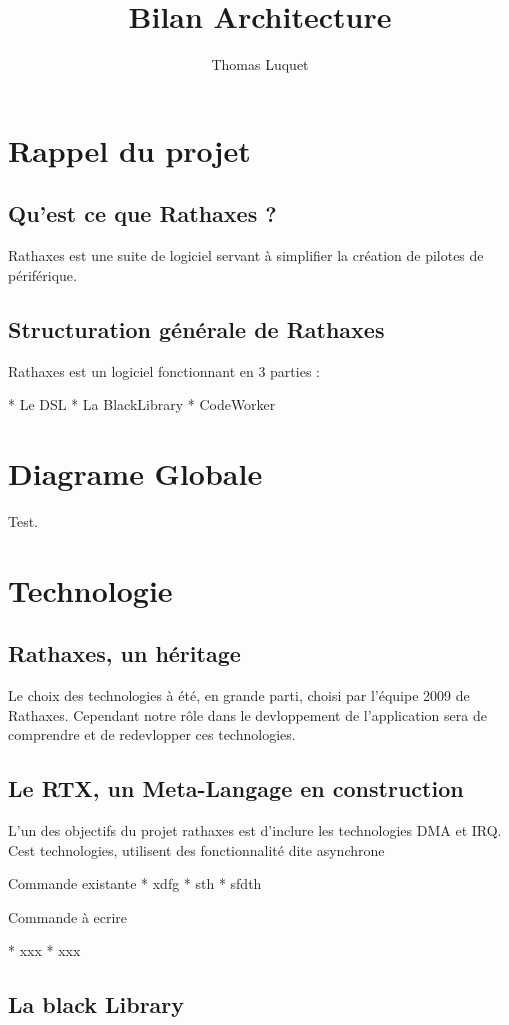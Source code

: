 \documentclass{rtxreport}
\author{Thomas Luquet}
\title{Bilan Architecture}
\begin{document}
\maketitle

\rtxmaketitleblock

\tableofcontents

\chapter{Rappel du projet}

\section{Qu'est ce que Rathaxes ?} 
Rathaxes est une suite de logiciel servant à simplifier la création de pilotes de périférique.

\section{Structuration générale de Rathaxes}
Rathaxes est un logiciel fonctionnant en 3 parties :

* Le DSL
* La BlackLibrary
* CodeWorker


\chapter{Diagrame Globale}

Test.

\chapter{Technologie}

\section{Rathaxes, un héritage}
Le choix des technologies à été, en grande parti, choisi par l'équipe 2009 de Rathaxes.
Cependant notre rôle dans le devloppement de l'application sera de comprendre et de redevlopper ces technologies.

\section{Le RTX, un Meta-Langage en construction}

L'un des objectifs du projet rathaxes est d'inclure les technologies DMA et IRQ.
Cest technologies, utilisent des fonctionnalité dite asynchrone

Commande existante
* xdfg
* sth
* sfdth

Commande à ecrire

* xxx
* xxx

\section{La black Library}
\end{document}

